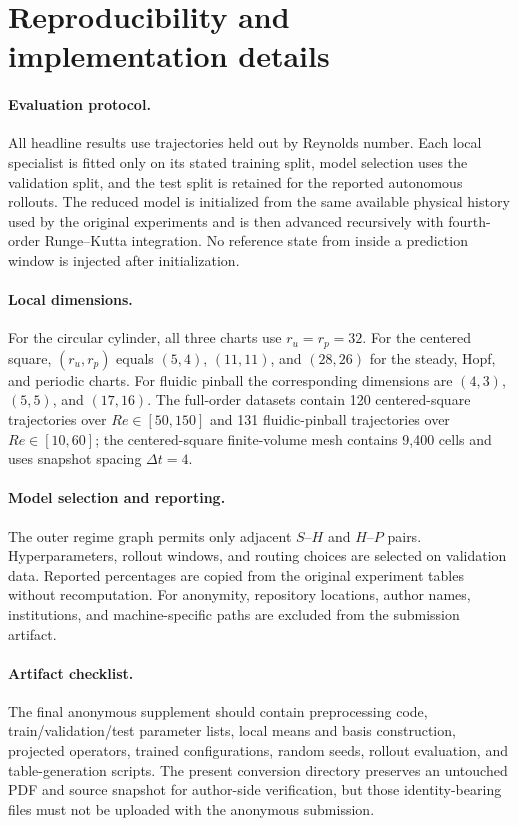 \section{Reproducibility and implementation details}
\label{app:implementation}

\paragraph{Evaluation protocol.}
All headline results use trajectories held out by Reynolds number. Each local specialist is fitted only on its stated training split, model selection uses the validation split, and the test split is retained for the reported autonomous rollouts. The reduced model is initialized from the same available physical history used by the original experiments and is then advanced recursively with fourth-order Runge--Kutta integration. No reference state from inside a prediction window is injected after initialization.

\paragraph{Local dimensions.}
For the circular cylinder, all three charts use $r_u=r_p=32$. For the centered square, $(r_u,r_p)$ equals $(5,4)$, $(11,11)$, and $(28,26)$ for the steady, Hopf, and periodic charts. For fluidic pinball the corresponding dimensions are $(4,3)$, $(5,5)$, and $(17,16)$. The full-order datasets contain 120 centered-square trajectories over $Re\in[50,150]$ and 131 fluidic-pinball trajectories over $Re\in[10,60]$; the centered-square finite-volume mesh contains 9,400 cells and uses snapshot spacing $\Delta t=4$.

\paragraph{Model selection and reporting.}
The outer regime graph permits only adjacent $S$--$H$ and $H$--$P$ pairs. Hyperparameters, rollout windows, and routing choices are selected on validation data. Reported percentages are copied from the original experiment tables without recomputation. For anonymity, repository locations, author names, institutions, and machine-specific paths are excluded from the submission artifact.

\paragraph{Artifact checklist.}
The final anonymous supplement should contain preprocessing code, train/validation/test parameter lists, local means and basis construction, projected operators, trained configurations, random seeds, rollout evaluation, and table-generation scripts. The present conversion directory preserves an untouched PDF and source snapshot for author-side verification, but those identity-bearing files must not be uploaded with the anonymous submission.

